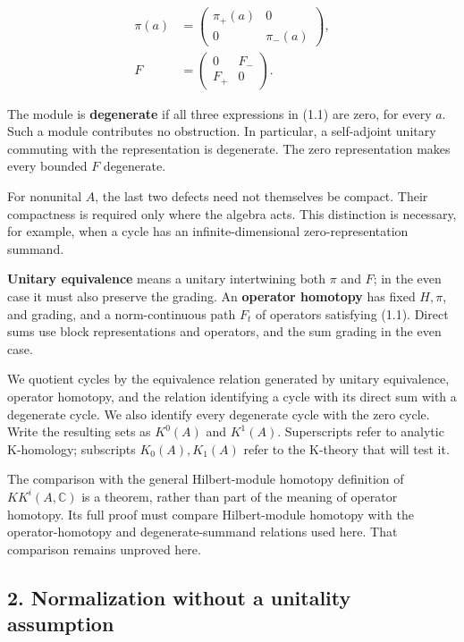 \documentclass[
  11pt,
]{article}
\begin{document}
\[
\begin{aligned}
\pi(a)&=\begin{pmatrix}\pi_+(a)&0\\0&\pi_-(a)\end{pmatrix},\\
F&=\begin{pmatrix}0&F_-\\F_+&0\end{pmatrix}.
\end{aligned}
\tag{1.2}
\]

The module is \textbf{degenerate} if all three expressions in (1.1) are
zero, for every \(a\). Such a module contributes no obstruction. In
particular, a self-adjoint unitary commuting with the representation is
degenerate. The zero representation makes every bounded \(F\)
degenerate.

For nonunital \(A\), the last two defects need not themselves be
compact. Their compactness is required only where the algebra acts. This
distinction is necessary, for example, when a cycle has an
infinite-dimensional zero-representation summand.

\textbf{Unitary equivalence} means a unitary intertwining both \(\pi\)
and \(F\); in the even case it must also preserve the grading. An
\textbf{operator homotopy} has fixed \(H,\pi\), and grading, and a
norm-continuous path \(F_t\) of operators satisfying (1.1). Direct sums
use block representations and operators, and the sum grading in the even
case.

We quotient cycles by the equivalence relation generated by unitary
equivalence, operator homotopy, and the relation identifying a cycle
with its direct sum with a degenerate cycle. We also identify every
degenerate cycle with the zero cycle. Write the resulting sets as
\(K^0(A)\) and \(K^1(A)\). Superscripts refer to analytic K-homology;
subscripts \(K_0(A),K_1(A)\) refer to the K-theory that will test it.

The comparison with the general Hilbert-module homotopy definition of
\(KK^i(A,\mathbb C)\) is a theorem, rather than part of the meaning of
operator homotopy. Its full proof must compare Hilbert-module homotopy
with the operator-homotopy and degenerate-summand relations used here.
That comparison remains unproved here.

\subsection{2. Normalization without a unitality
assumption}\label{normalization-without-a-unitality-assumption}
\end{document}
